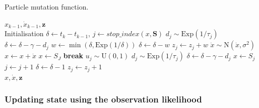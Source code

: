 \renewcommand{\algorithmicrequire}{\textbf{Start:}}
\newcommand{\algorithmicbreak}{\textbf{break}}
\newcommand{\Break}{\State \algorithmicbreak}
\begin{algorithm}[t]
    \caption{Particle mutation function.}
    \label{fig:algorithm}
    \begin{algorithmic}[2]
    \Require $x_{k-1}, \dot x_{k-1}, \boldsymbol z$\\
    Initialisation $\delta \gets t_k - t_{k-1}$, 
        $j \gets stop\_index(x, \boldsymbol{S})$
        \State $d_j \sim \mathrm{Exp}(1/\tau_j)$
        \State $\delta \gets \delta - \gamma - d_j$
        \State $w \gets \min(\delta, \mathrm{Exp}(1/\delta))$
        \State $\delta \gets \delta - w$
        \State $z_j \gets z_j + w$
    \EndIf
        \State $\dot x \sim \mathrm{N}(\dot x, \sigma^2)$
        \State $x \leftarrow x + \dot x$
                \State $x \gets S_J$
                \Break
            \EndIf
            \State $u_j \sim \mathrm{U}(0,1)$
                \State $d_j \sim \mathrm{Exp}(1/\tau_j)$
                \State $\delta \gets \delta - \gamma - d_j$
                \State $x \gets S_j$
            \EndIf
            \State $j\gets j+1$
        \EndIf
        \State $\delta \gets \delta - 1$
        \State $z_j \gets z_j + 1$
    \EndWhile
    \\
    \Return $x, \dot x, \boldsymbol z$
    \end{algorithmic}
\end{algorithm}

\afterpage{\clearpage}


\subsubsection{Updating state using the observation likelihood}
\label{sec:pf_update}

